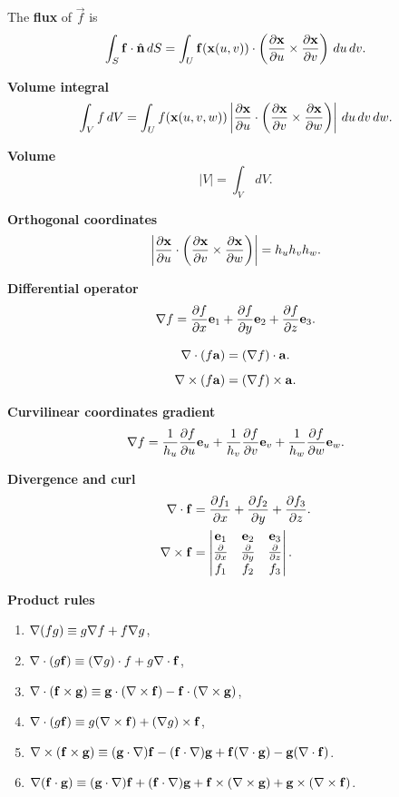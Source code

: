 \documentclass[10pt, a4paper]{article}
\begin{document}
The \textbf{flux} of $\vec{f}$ is
\[
\int_{S}\vec{f}\cdot\hat{\vec{n}}\,dS = \int_{U}\vec{f}(\vec{x}(u, v))\cdot\left(\pd[\vec{x}]{u}\times\pd[\vec{x}]{v}\right)\,du\,dv.
\]

\textbf{Volume integral}
\[
\int_{V}f\,dV = \int_{U}f(\vec{x}(u, v, w))\left|\pd[\vec{x}]{u}\cdot\left(\pd[\vec{x}]{v}\times\pd[\vec{x}]{w}\right)\right|\,du\,dv\,dw.
\]

\textbf{Volume}
\[
|V| = \int_{V}\,dV.
\]

\textbf{Orthogonal coordinates}
\[
\left|\pd[\vec{x}]{u}\cdot\left(\pd[\vec{x}]{v}\times\pd[\vec{x}]{w}\right)\right| = h_uh_vh_w.
\]

\textbf{Differential operator}
\[
\bnabla f = \pd[f]{x}\vec{e}_1 + \pd[f]{y}\vec{e}_2 + \pd[f]{z}\vec{e}_3.
\]

\[
\bnabla\cdot(f\vec{a}) = (\bnabla f)\cdot\vec{a}.
\]
\[
\bnabla\times(f\vec{a}) = (\bnabla f)\times \vec{a}.
\]

\textbf{Curvilinear coordinates gradient}
\[
\bnabla f = \frac{1}{h_u}\pd[f]{u}\vec{e}_u + \frac{1}{h_v}\pd[f]{v}\vec{e}_v + \frac{1}{h_w}\pd[f]{w}\vec{e}_w.
\]

\textbf{Divergence and curl}
\begin{align*}
    \bnabla \cdot \vec{f} &= \pd[f_1]{x} + \pd[f_2]{y} + \pd[f_3]{z}. \\
    \bnabla \times \vec{f} &= \begin{vmatrix}
        \vec{e}_1 & \vec{e}_2 & \vec{e}_3 \\
        \pd{x} & \pd{y} & \pd{z} \\
        f_1 & f_2 & f_3
    \end{vmatrix}.
\end{align*}

\textbf{Product rules}
\begin{enumerate}[label = (\roman*)]
    \item $\bnabla (fg) \equiv g\bnabla f + f\bnabla g$,
    
    \item $\bnabla \cdot (g\vec{f}) \equiv (\bnabla g) \cdot f + g \bnabla \cdot \vec{f}$,
    
    \item $\bnabla \cdot (\vec{f} \times \vec{g}) \equiv \vec{g} \cdot (\bnabla \times \vec{f}) - \vec{f}\cdot(\bnabla \times \vec{g})$,
    
    \item $\bnabla \cdot (g\vec{f}) \equiv g(\bnabla \times \vec{f}) + (\bnabla g) \times \vec{f}$,

    \item $\bnabla \times (\vec{f} \times \vec{g}) \equiv (\vec{g} \cdot \bnabla)\vec{f} - (\vec{f} \cdot \bnabla)\vec{g} + \vec{f}(\bnabla \cdot \vec{g}) - \vec{g}(\bnabla \cdot \vec{f})$.

    \item $\bnabla (\vec{f} \cdot \vec{g}) \equiv (\vec{g} \cdot \bnabla)\vec{f} + (\vec{f} \cdot \bnabla)\vec{g} + \vec{f} \times (\bnabla \times \vec{g}) + \vec{g} \times (\bnabla \times \vec{f})$.
\end{enumerate}
\end{document}
